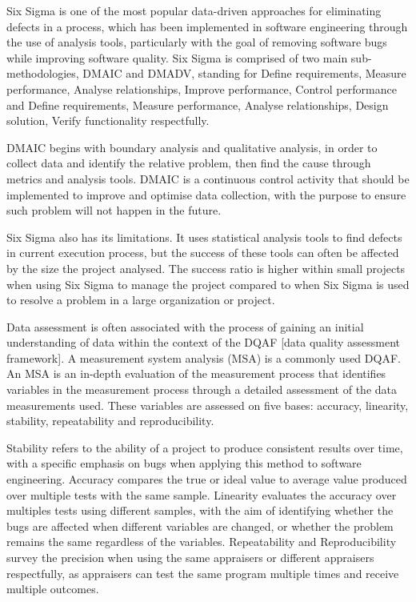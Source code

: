 \documentclass{article}
\begin{document}
Six Sigma is one of the most popular data-driven approaches for eliminating defects in a process, which has been implemented in software engineering through the use of analysis tools, particularly with the goal of removing software bugs while improving software quality. Six Sigma is comprised of two main sub-methodologies, DMAIC and DMADV, standing for Define requirements, Measure performance, Analyse relationships, Improve performance, Control performance and Define requirements, Measure performance, Analyse relationships, Design solution, Verify functionality respectfully. \newline

DMAIC begins with boundary analysis and qualitative analysis, in order to collect data and identify the relative problem, then find the cause through metrics and analysis tools. DMAIC is a continuous control activity that should be implemented to improve and optimise data collection, with the purpose to ensure such problem will not happen in the future. \newline

Six Sigma also has its limitations. It uses statistical analysis tools to find defects in current execution process, but the success of these tools can often be affected by the size the project analysed. The success ratio is higher within small projects when using Six Sigma to manage the project compared to when Six Sigma is used to resolve a problem in a large organization or project. \newline

Data assessment is often associated with the process of gaining an initial understanding of data within the context of the DQAF [data quality assessment framework]. A measurement system analysis (MSA) is a commonly used DQAF. An MSA is an in-depth evaluation of the measurement process that identifies variables in the measurement process through a detailed assessment of the data measurements used. These variables are assessed on five bases: accuracy, linearity, stability, repeatability and reproducibility. \newline

Stability refers to the ability of a project to produce consistent results over time, with a specific emphasis on bugs when applying this method to software engineering. Accuracy compares the true or ideal value to average value produced over multiple tests with the same sample. Linearity evaluates the accuracy over multiples tests using different samples, with the aim of identifying whether the bugs are affected when different variables are changed, or whether the problem remains the same regardless of the variables. Repeatability and Reproducibility survey the precision when using the same appraisers or different appraisers respectfully, as appraisers can test the same program multiple times and receive multiple outcomes. \newline
\end{document}
